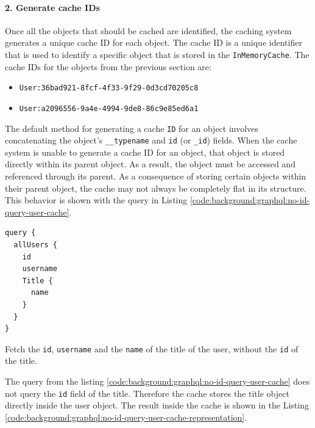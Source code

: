 \paragraph{2. Generate cache IDs}\label{paragraph:background:graphql:apollo-server-client:data-normalization:generate-cache-ids}

Once all the objects that should be cached are identified, the caching system generates a unique cache \ac{ID} for each object. The cache \ac{ID} is a unique identifier that is used to identify a specific object that is stored in the \texttt{InMemoryCache}. The cache \acp{ID} for the objects from the previous section are:

\begin{itemize}
  \item \texttt{User:36bad921-8fcf-4f33-9f29-0d3cd70205c8}
  \item \texttt{User:a2096556-9a4e-4994-9de8-86c9e85ed6a1}
\end{itemize}

\noindent The default method for generating a cache \texttt{ID} for an object involves concatenating the object's \texttt{\_\_typename} and \texttt{id} (or \texttt{\_id}) fields. When the cache system is unable to generate a cache ID for an object, that object is stored directly within its parent object. As a result, the object must be accessed and referenced through its parent. As a consequence of storing certain objects within their parent object, the cache may not always be completely flat in its structure. This behavior is shown with the query in Listing \ref{code:background:graphql:no-id-query-user-cache}. 

\ifshowListings
\begin{listing}[H]
  \begin{verbatim}
query {
  allUsers {
    id
    username
    Title {
      name
    }
  }
}
  \end{verbatim}
  \caption{Fetch the \texttt{id}, \texttt{username} and the \texttt{name} of the title of the user, without the \texttt{id} of the title.}\label{code:background:graphql:no-id-query-user-cache}
\end{listing}
\fi

\noindent The query from the listing \ref{code:background:graphql:no-id-query-user-cache} does not query the \texttt{id} field of the title. Therefore the cache stores the title object directly inside the user object. The result inside the cache is shown in the Listing
\ref{code:background:graphql:no-id-query-user-cache-representation}. 

